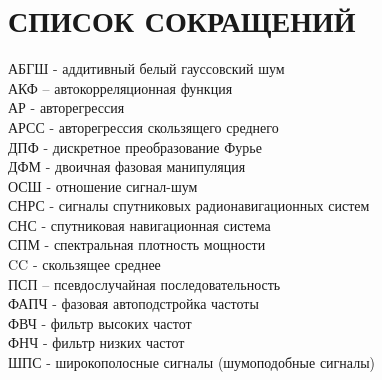 \section*{СПИСОК СОКРАЩЕНИЙ}
АБГШ - аддитивный белый гауссовский шум				\\
АКФ – автокорреляционная функция				\\
АР - авторегрессия						\\
АРСС - авторегрессия скользящего среднего			\\
ДПФ - дискретное преобразование Фурье				\\
ДФМ - двоичная фазовая манипуляция				\\
ОСШ - отношение сигнал-шум 					\\
СНРС - сигналы спутниковых радионавигационных систем		\\
СНС - спутниковая навигационная система				\\
СПМ - спектральная плотность мощности				\\
CC - скользящее среднее						\\
ПСП – псевдослучайная последовательность			\\
ФАПЧ - фазовая автоподстройка частоты				\\
ФВЧ - фильтр высоких частот					\\
ФНЧ - фильтр низких частот					\\
ШПС -  широкополосные сигналы (шумоподобные сигналы)		\\
\newpage
